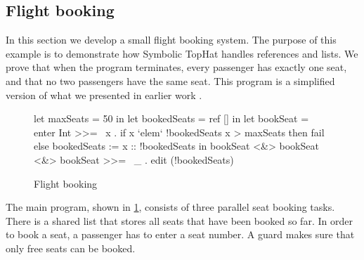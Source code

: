 \subsection{Flight booking}

In this section we develop a small flight booking system.
The purpose of this example is to demonstrate how Symbolic TopHat handles references and lists.
We prove that when the program terminates, every passenger has exactly one seat, and that no two passengers have the same seat.
This program is a simplified version of what we presented in earlier work \cite{Steenvoorden2019}.

\begin{figure}[h]
\begin{TASK}
  let maxSeats = 50 in
  let bookedSeats = ref [] in
  let bookSeat = enter Int >>= \ x .
    if x `elem` !bookedSeats \/ x > maxSeats
      then fail else bookedSeats := x :: !bookedSeats in
  bookSeat <&> bookSeat <&> bookSeat >>= \ _ .
  edit (!bookedSeats)
\end{TASK}
\caption{Flight booking}
\label{fig:flight-booking}
\end{figure}

The main program, shown in \cref{fig:flight-booking}, consists of three parallel seat booking tasks.
There is a shared list that stores all seats that have been booked so far.
In order to book a seat, a passenger has to enter a seat number.
A guard makes sure that only free seats can be booked.
